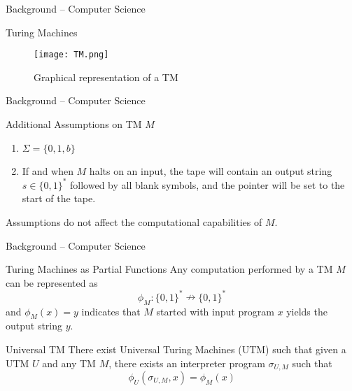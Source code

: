 

\begin{frame}{Background -- Computer Science}
 \begin{block}{Turing Machines}
        \begin{figure}
            \centering
            \texttt{[image: TM.png]}
            \caption{Graphical representation of a TM}
            \label{fig:TM}
        \end{figure}
    \end{block}
\end{frame}

\begin{frame}{Background -- Computer Science}
    \begin{block}{Additional Assumptions on TM $M$}
    \begin{enumerate}
        \item $\Sigma = \{0,1,b\}$
        \item If and when $M$ halts on an input, the tape will contain an output string $s\in \{0,1\}^*$ followed by all blank symbols, and the pointer will be set to the start of the tape.
    \end{enumerate}
    Assumptions do not affect the computational capabilities of $M$.
    \end{block}
\end{frame}

\begin{frame}{Background -- Computer Science}
    \begin{block}{Turing Machines as Partial Functions}
    Any computation performed by a TM $M$ can be represented as
    \begin{equation*}
        \phi_M:\{0,1\}^* \nrightarrow \{0,1\}^*
    \end{equation*}
    and $\phi_M(x) = y$ indicates that $M$ started with input program $x$ yields the output string $y$.
    \end{block}
    \begin{block}{Universal TM}
    There exist Universal Turing Machines (UTM) such that given a UTM $U$ and any TM $M$, there exists an interpreter program $\sigma_{U,M}$ such that
    \begin{equation*}
        \phi_U(\sigma_{U,M},x) = \phi_M(x)
    \end{equation*}
    \end{block}
\end{frame}


